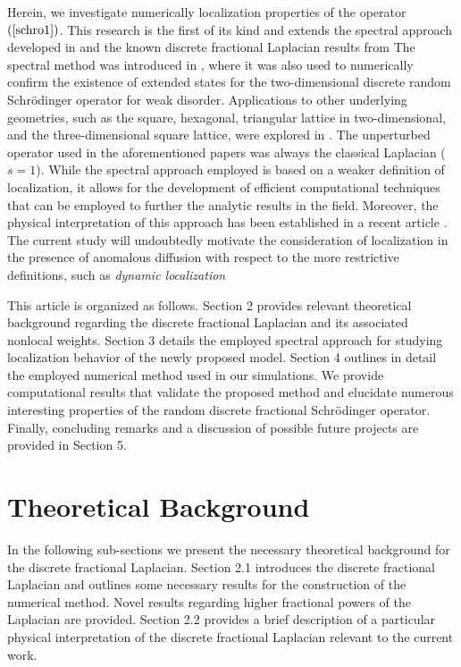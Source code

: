 \documentclass[final,1p,times]{elsarticle}
\def\R#1{$(\ref{#1})$}
\theoremstyle{remark}
\theoremstyle{definition}
\newcommand{\josh}[1]{\textcolor{red}{\textbf{#1}}}
\begin{document}
Herein, we investigate numerically localization properties of the operator \R{schro1}. This research is the first of its kind and extends the spectral approach developed in \cite{Liaw2013} and the known discrete fractional Laplacian results from \cite{ciaurri2015fractional} 
The spectral method was introduced in \cite{Liaw2013}, where it was also used to numerically confirm the existence of extended states for the two-dimensional discrete random Schr\"odinger operator for weak disorder. Applications to other underlying geometries, such as the square, hexagonal, triangular lattice in two-dimensional, and the three-dimensional square lattice, were explored in \cite{1751-8121-47-30-305202,2053-1591-3-12-125904,PhysRevB.96.235408,kostadinova2018transport}. The unperturbed operator used in the aforementioned papers was always the classical Laplacian ($s=1$). 
While the spectral approach employed is based on a weaker definition of localization, it allows for the development of efficient computational techniques that can be employed to further the analytic results in the field. Moreover, the physical interpretation of this approach has been established in a recent article \cite{2053-1591-3-12-125904}. The current study will undoubtedly motivate the consideration of localization in the presence of anomalous diffusion with respect to the more restrictive definitions, such as {\em dynamic localization} 

This article is organized as follows. Section 2 provides relevant theoretical background regarding the discrete fractional Laplacian and its associated nonlocal weights. Section 3 details the employed spectral approach for studying localization behavior of the newly proposed model. Section 4 outlines in detail the employed numerical method used in our simulations. We provide computational results that validate the proposed method and elucidate numerous interesting properties of the random discrete fractional Schr{\"o}dinger operator. Finally, concluding remarks and a discussion of possible future projects are provided in Section 5. 

\section{Theoretical Background}

In the following sub-sections we present the necessary theoretical background for the discrete fractional Laplacian. Section 2.1 introduces the discrete fractional Laplacian and outlines some necessary results for the construction of the numerical method. Novel results regarding higher fractional powers of the Laplacian are provided. Section 2.2 provides a brief description of a particular physical interpretation of the discrete fractional Laplacian relevant to the current work. 
\end{document}
